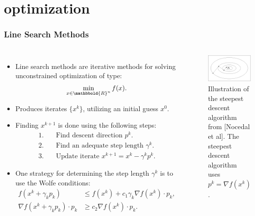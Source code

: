 \documentclass[9pt]{beamer}
\begin{document}
\section{optimization}
\begin{frame}
\frametitle{Line Search Methods}
\begin{columns}
\begin{itemize}
\item{Line search methods are iterative methods for solving unconstrained optimization of type:
\begin{align*}
\min_{x\in\mathbbold{R}^n}f(x).
\end{align*}}
\item{Produces iterates $\{x^k\}$, utilizing an initial guess $x^0$.}
\item{Finding $x^{k+1}$ is done using the following steps: {\small
\begin{align*}
1.\quad& \textrm{Find descent direction $p^k$.}\\
2.\quad& \textrm{Find an adequate step length $\gamma^k$.}\\
3.\quad& \textrm{Update iterate $x^{k+1} = x^k -\gamma^k p^k$.}
\end{align*}
}%
}
\item{One strategy for determining the step length $\gamma^k$ is to use the Wolfe conditions:
{\small \begin{align*}
f(x^k + \gamma_kp_k)&\leq f(x^k) + c_1\gamma_k\nabla f(x^k)\cdot p_k, \\
\nabla f(x^k + \gamma_kp_k) \cdot p_k &\geq c_2 \nabla f(x^k)\cdot p_k.
\end{align*}}}
\end{itemize}
\begin{figure}[!h]
\centering
\includegraphics[scale=0.3,angle=90]{SD.png}
\caption{Illustration of the steepest descent algorithm from [Nocedal et al]. The steepest descent algorithm uses $p^k=\nabla f(x^k)$.}
\end{figure}
\end{columns}
\end{frame}
\end{document}
